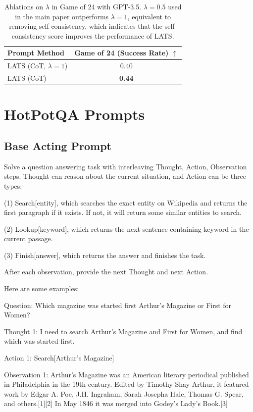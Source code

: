 {\begin{table}[t]
  \centering
  \begin{tabular}{l|c}
  \toprule
    Prompt Method & Game of 24 (Success Rate) $\uparrow$ \\
    \midrule
    LATS (CoT, $\lambda=1$) & 0.40  \\
    LATS (CoT) & \textbf{0.44}  \\
    \bottomrule
    \end{tabular}
    \caption{Ablations on $\lambda$ in Game of 24 with GPT-3.5. $\lambda = 0.5$ used in the main paper outperforms $\lambda=1$, equivalent to removing self-consistency, which indicates that the self-consistency score improves the performance of LATS.
    }
    \label{table:game24-abl}
    \vspace{-0.1in}
\end{table}

\section{HotPotQA Prompts}
\label{sec:hotpotqa_prompt}
\subsection{Base Acting Prompt}

Solve a question answering task with interleaving Thought, Action, Observation steps. Thought can reason about the current situation, and Action can be three types: 

(1) Search[entity], which searches the exact entity on Wikipedia and returns the first paragraph if it exists. If not, it will return some similar entities to search.

(2) Lookup[keyword], which returns the next sentence containing keyword in the current passage.

(3) Finish[answer], which returns the answer and finishes the task.

After each observation, provide the next Thought and next Action. 

Here are some examples:

Question: Which magazine was started first Arthur's Magazine or First for Women?

Thought 1: I need to search Arthur's Magazine and First for Women, and find which was started first.

Action 1: Search[Arthur's Magazine]

Observation 1: Arthur's Magazine was an American literary periodical published in Philadelphia in the 19th century. Edited by Timothy Shay Arthur, it featured work by Edgar A. Poe, J.H. Ingraham, Sarah Josepha Hale, Thomas G. Spear, and others.[1][2] In May 1846 it was merged into Godey's Lady's Book.[3]

}
